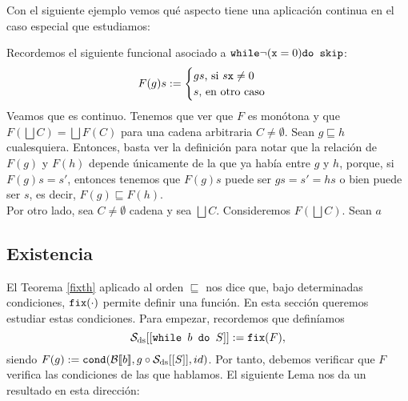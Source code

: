 Con el siguiente ejemplo vemos qué aspecto tiene una aplicación continua en el caso especial que estudiamos:
\begin{example}
Recordemos el siguiente funcional asociado a $\texttt{while} \neg(\texttt{x}=0)\texttt{do skip}$:
$$F(g)s := \begin{cases}
    gs \text{, si } s\texttt{x} \neq 0\\
    s \text{, en otro caso}
\end{cases}$$
Veamos que es continuo. Tenemos que ver que $F$ es monótona y que $F(\bigsqcup C) = \bigsqcup F(C)$ para una cadena arbitraria $C\neq \emptyset$. Sean $g \sqsubseteq h$ cualesquiera. Entonces, basta ver la definición para notar que la relación de $F(g)$ y $F(h)$ depende únicamente de la que ya había entre $g$ y $h$, porque, si $F(g)s = s'$, entonces tenemos que $F(g)s$ puede ser $gs = s' = hs$ o bien puede ser $s$, es decir, $F(g)\sqsubseteq F(h)$. 
\\

Por otro lado, sea $C \neq \emptyset$ cadena y sea $\bigsqcup C$. Consideremos $F(\bigsqcup C)$. Sean $a$
\end{example}

\subsection{Existencia}

El Teorema \ref{fixth} aplicado al orden $\sqsubseteq$ nos dice que, bajo determinadas condiciones, $\texttt{fix}(\cdot)$ permite definir una función. En esta sección queremos estudiar estas condiciones. Para empezar, recordemos que definíamos 
$$\mathcal{S}_{\mathrm{ds}} [[\texttt{while } b \texttt{ do } S]] :=  \texttt{fix}(F),$$
siendo $F(g) := \texttt{cond}(\mathcal{B}[\![b]\!], g\circ \mathcal{S}_{\mathrm{ds}}[[S]], id)$. Por tanto, debemos verificar que $F$ verifica las condiciones de las que hablamos. El siguiente Lema nos da un resultado en esta dirección:

